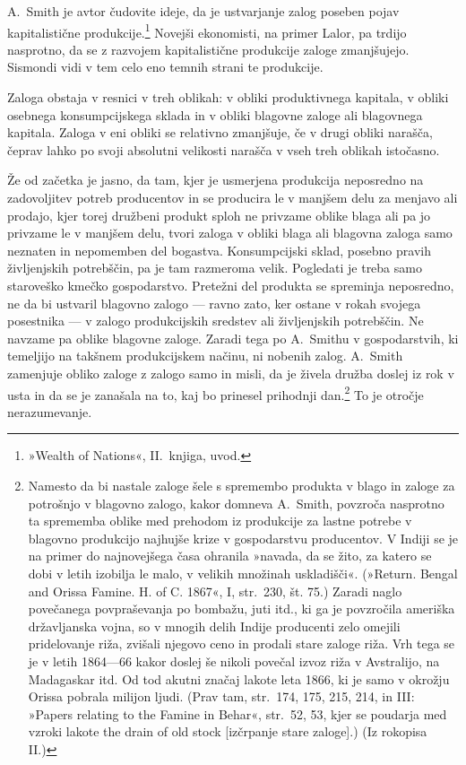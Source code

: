 \documentclass[kapital_02.tex]{subfiles}
\begin{document}
A.\ Smith je avtor čudovite ideje, da je ustvarjanje zalog poseben pojav kapitalistične produkcije.\footnote
{»Wealth of Nations«, II.\ knjiga, uvod.}
Novejši ekonomisti, na primer Lalor, pa trdijo nasprotno, da se z razvojem kapitalistične produkcije zaloge zmanjšujejo. Sismondi vidi v tem celo eno temnih strani te produkcije.

Zaloga obstaja v resnici v treh oblikah: v obliki produktivnega kapitala, v obliki osebnega konsumpcijskega sklada in v obliki blagovne zaloge ali blagovnega kapitala.
Zaloga v eni obliki se relativno zmanjšuje, če v drugi obliki narašča, čeprav lahko po svoji absolutni velikosti narašča v vseh treh oblikah istočasno.

Že od začetka je jasno, da tam, kjer je usmerjena produkcija neposredno na zadovoljitev potreb producentov in se producira le v manjšem delu za menjavo ali prodajo, kjer torej družbeni produkt sploh ne privzame oblike blaga ali pa jo privzame le v manjšem delu, tvori zaloga v obliki blaga ali blagovna zaloga samo neznaten in nepomemben del bogastva.
Konsumpcijski sklad, posebno pravih življenjskih potrebščin, pa je tam razmeroma velik. 
Pogledati je treba samo staroveško kmečko gospodarstvo. 
Pretežni del produkta se spreminja neposredno, ne da bi ustvaril blagovno zalogo — ravno zato, ker ostane v rokah svojega posestnika — v zalogo produkcijskih sredstev ali življenjskih potrebščin.
Ne navzame pa oblike blagovne zaloge.
Zaradi tega po A.\ Smithu v gospodarstvih, ki temeljijo na takšnem produkcijskem načinu, ni nobenih zalog. A.\ Smith zamenjuje obliko zaloge z zalogo samo in misli, da je živela družba doslej iz rok v usta in da se je zanašala na to, kaj bo prinesel prihodnji dan.\footnote
{Namesto da bi nastale zaloge šele s spremembo produkta v blago in zaloge za potrošnjo v blagovno zalogo, kakor domneva A.\ Smith, povzroča nasprotno ta sprememba oblike med prehodom iz produkcije za lastne potrebe v blagovno produkcijo najhujše krize v gospodarstvu producentov.
V Indiji se je na primer do najnovejšega časa ohranila »navada, da se žito, za katero se dobi v letih izobilja le malo, v velikih množinah uskladišči«.
(»Return. Bengal and Orissa Famine. H. of C. 1867«, I, str.\ 230, št. 75.)
Zaradi naglo povečanega povpraševanja po bombažu, juti itd., ki ga je povzročila ameriška državljanska vojna, so v mnogih delih Indije producenti zelo omejili pridelovanje riža, zvišali njegovo ceno in prodali stare zaloge riža.
Vrh tega se je v letih 1864—66 kakor doslej še nikoli povečal izvoz riža v Avstralijo, na Madagaskar itd.
Od tod akutni značaj lakote leta 1866, ki je samo v okrožju Orissa pobrala milijon ljudi.
(Prav tam, str.\ 174, 175, 215, 214, in III: »Papers relating to the Famine in Behar«, str.\ 52, 53, kjer se poudarja med vzroki lakote the drain of old stock [izčrpanje stare zaloge].)
(Iz rokopisa II.)}
To je otročje nerazumevanje.
\end{document}
